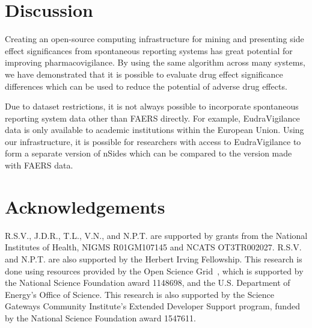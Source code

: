 \documentclass{ws-procs11x85}
\begin{document}
\section{Discussion}

Creating an open-source computing infrastructure for mining and
presenting side effect significances from spontaneous reporting
systems has great potential for improving pharmacovigilance. By using
the same algorithm across many systems, we have demonstrated that it
is possible to evaluate drug effect significance differences which can
be used to reduce the potential of adverse drug effects.

Due to dataset restrictions, it is not always possible to incorporate
spontaneous reporting system data other than FAERS directly. For
example, EudraVigilance data is only available to academic
institutions within the European Union. Using our infrastructure, it
is possible for researchers with access to EudraVigilance to form a
separate version of nSides which can be compared to the version made
with FAERS data.

\section{Acknowledgements}
R.S.V., J.D.R., T.L., V.N., and N.P.T. are supported by grants from
the National Institutes of Health, NIGMS R01GM107145 and NCATS
OT3TR002027. R.S.V. and N.P.T. are also supported by the Herbert
Irving Fellowship. This research is done using resources provided by
the Open Science Grid~\cite{pordes2007open, sfiligoi2009pilot}, which
is supported by the National Science Foundation award 1148698, and the
U.S. Department of Energy's Office of Science.  This research is also
supported by the Science Gateways Community Institute's Extended
Developer Support program, funded by the National Science Foundation
award 1547611.







\end{document}
